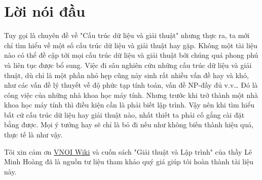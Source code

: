 \chapter*{Lời nói đầu}
Tuy gọi là chuyên đề về "Cấu trúc dữ liệu và giải thuật" nhưng thực ra, ta mới chỉ tìm hiểu về một số cấu trúc dữ liệu và giải thuật hay gặp. Không một tài liệu nào có thể đề cập tới mọi cấu trúc dữ liệu và giải thuật bởi chúng quá phong phú và liên tục được bổ sung. Việc đi sâu nghiên cứu những cấu trúc dữ liệu và giải thuật, dù chỉ là một phần nhỏ hẹp cũng nảy sinh rất nhiều vấn đề hay và khó, như các vấn đề lý thuyết về độ phức tạp tính toán, vấn đề NP-đầy đủ v.v… Đó là công việc của những nhà khoa học máy tính. Nhưng trước khi trở thành một nhà khoa học máy tính thì điều kiện cần là phải biết lập trình. Vậy nên khi tìm hiểu bất cứ cấu trúc dữ liệu hay giải thuật nào, nhất thiết ta phải cố gắng cài đặt bằng được. Mọi ý tưởng hay sẽ chỉ là bỏ đi nếu như không biến thành hiệu quả, thực tế là như vậy.

Tôi xin cảm ơn \href{https://wiki.vnoi.info}{VNOI Wiki} và cuốn sách "Giải thuật và Lập trình" của thầy Lê Minh Hoàng đã là nguồn tư liệu tham khảo quý giá giúp tôi hoàn thành tài liệu này.